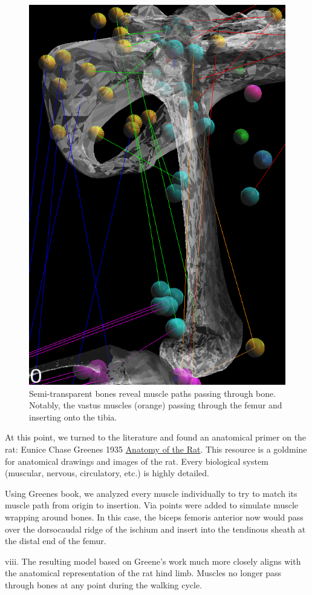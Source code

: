 \documentclass[runningheads,a4paper]{llncs}
\begin{document}
			\begin{figure}
				\centering
				\includegraphics[width=.5\textwidth]{att8.PNG}
				\caption{Semi-transparent bones reveal muscle paths passing through bone. Notably, the vastus muscles (orange) passing through the femur and inserting onto the tibia.}
			\end{figure}
	At this point, we turned to the literature and found an anatomical primer on the rat: Eunice Chase Greene\textquotesingle s 1935 \underline{Anatomy of the Rat}\cite{greene_anatomy_1955}. This resource is a goldmine for anatomical drawings and images of the rat. Every biological system (muscular, nervous, circulatory, etc.) is highly detailed. \par
	Using Greene\textquotesingle s book, we analyzed every muscle individually to try to match its muscle path from origin to insertion. Via points were added to simulate muscle wrapping around bones. In this case, the biceps femoris anterior now would pass over the dorsocaudal ridge of the ischium and insert into the tendinous sheath at the distal end of the femur. \par
	viii.	The resulting model based on Greene’s work much more closely aligns with the anatomical representation of the rat hind limb. Muscles no longer pass through bones at any point during the walking cycle. \par
\end{document}
